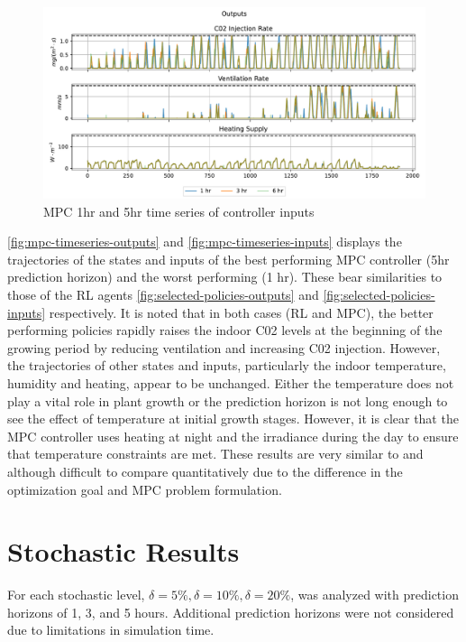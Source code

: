 \begin{figure}[H]
	\centering
	\includegraphics[width=\textwidth]{figures/mpc_inputs_times_series.pdf}
	\caption{MPC 1hr and 5hr time series of controller inputs}
	\label{fig:mpc-timeseries-inputs}
\end{figure}

\autoref{fig:mpc-timeseries-outputs} and \autoref{fig:mpc-timeseries-inputs} displays the trajectories of the states and inputs of the best performing MPC controller (5hr prediction horizon) and the worst performing (1 hr). These bear similarities to those of the RL agents \autoref{fig:selected-policies-outputs} and \autoref{fig:selected-policies-inputs} respectively. It is noted that in both cases (RL and MPC), the better performing policies rapidly raises the indoor C02 levels at the beginning of the growing period by reducing ventilation and increasing C02 injection. However, the trajectories of other states and inputs, particularly the indoor temperature, humidity and heating, appear to be unchanged. Either the temperature does not play a vital role in plant growth or the prediction horizon is not long enough to see the effect of temperature at initial growth stages. However, it is clear that the MPC controller uses heating at night and the irradiance during the day to ensure that temperature constraints are met. These results are very similar to \cite{morcegoReinforcementLearningModel2023} and \cite{boersmaRobustSamplebasedModel2022} although difficult to compare quantitatively due to the difference in the optimization goal and MPC problem formulation.


\section{Stochastic Results}
For each stochastic level, $\delta = 5\%, \delta = 10\%, \delta = 20\%$, was analyzed with prediction horizons of 1, 3, and 5 hours. Additional prediction horizons were not considered due to limitations in simulation time. 


